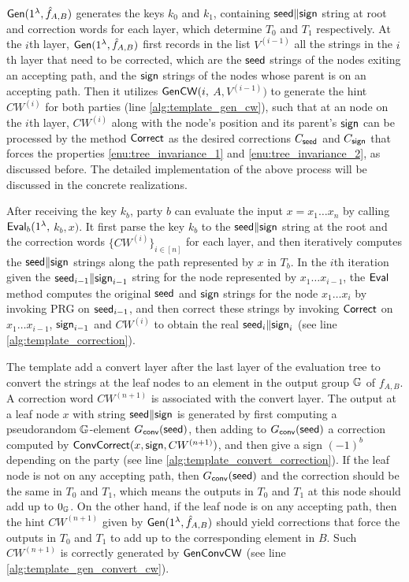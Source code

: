 ${\sf Gen}(1^\lambda, \hat{f}_{A,B})$ generates the keys $k_0$ and $k_1$, containing ${\sf seed}\|{\sf sign}$ string at root and correction words for each layer, which determine $T_0$ and $T_1$ respectively. 
At the $i$th layer, ${\sf Gen}(1^\lambda, \hat{f}_{A,B})$ first records in the list $V^{(i-1)}$ all the strings in the $i$th layer that need to be corrected, which are the ${\sf seed}$ strings of the nodes exiting an accepting path, and the ${\sf sign}$ strings of the nodes whose parent is on an accepting path. Then it utilizes ${\sf GenCW}(i,$ $A, V^{(i-1)})$ to generate the hint $CW^{(i)}$ for both parties (line \ref{alg:template_gen_cw}), such that at an node on the $i$th layer, $CW^{(i)}$ along with the node's position and its parent's ${\sf sign}$ can be processed by the method ${\sf Correct}$ as the desired corrections $C_{\sf seed}$ and $C_{\sf sign}$ that forces the properties \ref{enu:tree_invariance_1} and \ref{enu:tree_invariance_2}, as discussed before. 
The detailed implementation of the above process will be discussed in the concrete realizations.


After receiving the key $k_b$, party $b$ can evaluate the input $x=x_1\dots x_n$ by calling ${\sf Eval}_b(1^\lambda,$ $k_b,x)$. It first parse the key $k_b$ to the ${\sf seed}\|{\sf sign}$ string at the root and the correction words $\{CW^{(i)}\}_{i\in[n]}$ for each layer, and then iteratively computes the ${\sf seed}\|{\sf sign}$ strings along the path represented by $x$ in $T_b$. In the $i$th iteration given the ${\sf seed}_{i-1}\|{\sf sign}_{i-1}$ string for the node represented by $x_1\dots x_{i-1}$, the ${\sf Eval}$ method computes the original ${\sf seed}$ and ${\sf sign}$ strings for the node $x_1\dots x_{i}$ by invoking PRG on ${\sf seed}_{i-1}$, and then correct these strings by invoking ${\sf Correct}$ on $x_1\dots x_{i-1}$, ${\sf sign}_{i-1}$ and $CW^{(i)}$ to obtain the real ${\sf seed}_i\|{\sf sign}_i$ (see line \ref{alg:template_correction}).  

The template add a convert layer after the last layer of the evaluation tree to convert the strings at the leaf nodes to an element in the output group $\mathbb{G}$ of $f_{A,B}$. A correction word $CW^{(n+1)}$ is associated with the convert layer. The output at a leaf node $x$ with string ${\sf seed}\|{\sf sign}$ is generated by first computing a pseudorandom $\mathbb{G}$-element $G_{\sf conv}({\sf seed})$, then adding to $G_{\sf conv}({\sf seed})$ a correction computed by ${\sf ConvCorrect}(x, {\sf sign}, CW^{(n+1)})$, and then give a sign $(-1)^b$ depending on the party (see line \ref{alg:template_convert_correction}). If the leaf node is not on any accepting path, then $G_{\sf conv}({\sf seed})$ and the correction should be the same in $T_0$ and $T_1$, which means the outputs in $T_0$ and $T_1$ at this node should add up to $0_{\mathbb{G}}$. On the other hand, if the leaf node is on any accepting path, then the hint $CW^{(n+1)}$ given by ${\sf Gen}(1^\lambda, \hat{f}_{A,B})$ should yield corrections that force the outputs in $T_0$ and $T_1$ to add up to the corresponding element in $B$. Such $CW^{(n+1)}$ is correctly generated by $\sf GenConvCW$ (see line \ref{alg:template_gen_convert_cw}). 


